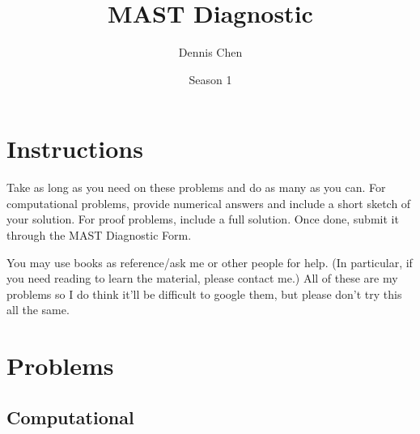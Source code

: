 \documentclass{lucky}
\title{MAST Diagnostic}
\author{Dennis Chen}
\date{Season 1}
\begin{document}
\maketitle

\section{Instructions}
Take as long as you need on these problems and do as many as you can. For computational problems, provide numerical answers and include a short sketch of your solution. For proof problems, include a full solution. Once done, submit it through the MAST Diagnostic Form.

You may use books as reference/ask me or other people for help. (In particular, if you need reading to learn the material, please contact me.) All of these are my problems so I do think it'll be difficult to google them, but please don't try this all the same.

\section{Problems}

\subsection{Computational}
\end{document}
